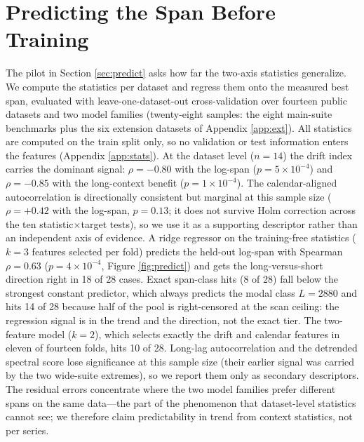 \section{Predicting the Span Before Training}
\label{sec:predictfull}

The pilot in Section \ref{sec:predict} asks how far the two-axis statistics generalize. We compute the statistics per dataset and regress them onto the measured best span, evaluated with leave-one-dataset-out cross-validation over fourteen public datasets and two model families (twenty-eight samples: the eight main-suite benchmarks plus the six extension datasets of Appendix \ref{app:ext}). All statistics are computed on the train split only, so no validation or test information enters the features (Appendix \ref{app:stats}). At the dataset level ($n{=}14$) the drift index carries the dominant signal: $\rho = -0.80$ with the log-span ($p = 5\times10^{-4}$) and $\rho = -0.85$ with the long-context benefit ($p = 1\times10^{-4}$). The calendar-aligned autocorrelation is directionally consistent but marginal at this sample size ($\rho = +0.42$ with the log-span, $p = 0.13$; it does not survive Holm correction across the ten statistic$\times$target tests), so we use it as a supporting descriptor rather than an independent axis of evidence. A ridge regressor on the training-free statistics ($k{=}3$ features selected per fold) predicts the held-out log-span with Spearman $\rho = 0.63$ ($p = 4\times10^{-4}$, Figure \ref{fig:predict}) and gets the long-versus-short direction right in 18 of 28 cases. Exact span-class hits (8 of 28) fall below the strongest constant predictor, which always predicts the modal class $L{=}2880$ and hits 14 of 28 because half of the pool is right-censored at the scan ceiling: the regression signal is in the trend and the direction, not the exact tier. The two-feature model ($k{=}2$), which selects exactly the drift and calendar features in eleven of fourteen folds, hits 10 of 28. Long-lag autocorrelation and the detrended spectral score lose significance at this sample size (their earlier signal was carried by the two wide-suite extremes), so we report them only as secondary descriptors. The residual errors concentrate where the two model families prefer different spans on the same data---the part of the phenomenon that dataset-level statistics cannot see; we therefore claim predictability in trend from context statistics, not per series.


